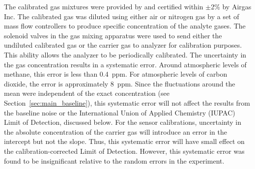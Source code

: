 \documentclass[preprint,sort&compress]{elsarticle}
\begin{document}
			The calibrated gas mixtures were provided by and certified within $\pm$2\% by Airgas Inc.
			The calibrated gas was diluted using either air or nitrogen gas by a set of mass flow controllers to produce specific concentration of the analyte gases.
			The solenoid valves in the gas mixing apparatus were used to send either the undiluted calibrated gas or the carrier gas to analyzer for calibration purposes.
			This ability allows the analyzer to be periodically calibrated.
			The uncertainty in the gas concentration results in a systematic error.
			Around atmospheric levels of methane, this error is less than 0.4~ppm.
			For atmospheric levels of carbon dioxide, the error is approximately 8~ppm.
			Since the fluctuations around the mean were independent of the exact concentration (see Section~\ref{sec:main_baseline}), this systematic error will not affect the results from the baseline noise or the International Union of Applied Chemistry (IUPAC) Limit of Detection, discussed below.
			For the sensor calibrations, uncertainty in the absolute concentration of the carrier gas will introduce an error in the intercept but not the slope.
			Thus, this systematic error will have small effect on the calibration-corrected Limit of Detection.
			However, this systematic error was found to be insignificant relative to the random errors in the experiment.
			
\end{document}

